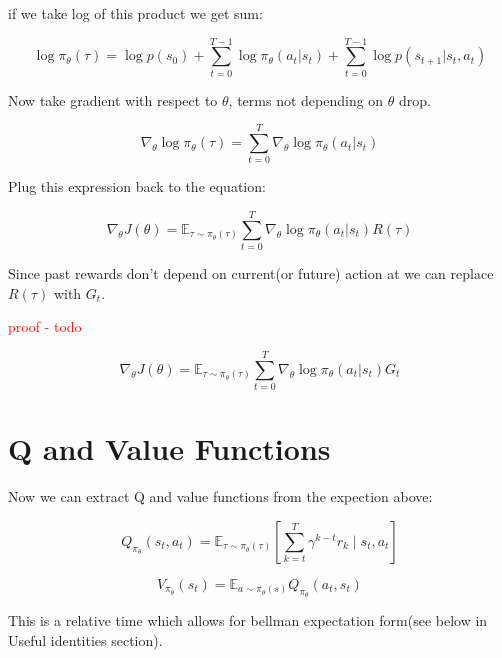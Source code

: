 \documentclass[preprint,12pt]{elsarticle}
\begin{document}
if we take log of this product we get sum:

\begin{equation}
\label{eq:trajectory-log-probability}
\log \pi_\theta(\tau) = \log p(s_0) +  \sum_{t=0}^{T-1} \log \pi_\theta(a_t|s_t) + \sum_{t=0}^{T-1} \log p(s_{t+1}|s_t, a_t)
\end{equation}

Now take gradient with respect to $\theta$, terms not depending on $\theta$ drop.

\begin{equation}
\label{eq:trajectory-score}
\nabla_\theta \log \pi_\theta(\tau) = \sum_{t=0}^T \nabla_\theta \log \pi_\theta(a_t | s_t)
\end{equation}

Plug this expression back to the equation:

\begin{equation}
\label{eq:policy-gradient-full-return}
\nabla_\theta J(\theta) = \mathbb{E}_{\tau \sim \pi_\theta(\tau)}  \sum_{t=0}^T \nabla_\theta \log \pi_\theta(a_t | s_t)  R(\tau)
\end{equation}


Since past rewards don’t depend on current(or future) action at  we can replace $R(\tau)$ with $G_t$.

\textcolor{red}{proof - todo} 
 
\begin{equation}
\label{eq:reinforce-gradient}
\nabla_\theta J(\theta) = \mathbb{E}_{\tau \sim \pi_\theta(\tau)}  \sum_{t=0}^T \nabla_\theta \log \pi_\theta(a_t | s_t)  G_t
\end{equation}

\section{Q and Value Functions}
Now we can extract Q and value functions from the expection above:

\begin{equation}
\label{eq:q-function}
Q_{\pi_\theta}(s_t, a_t) = \mathbb{E}_{\tau \sim \pi_\theta(\tau)}  \left[ \sum_{k=t}^T \gamma^{k-t} r_k \mid s_t, a_t \right]
\end{equation}

\begin{equation}
\label{eq:value-function}
V_{\pi_\theta}(s_t) = \mathbb{E}_{a \sim \pi_\theta(s)} Q_{\pi_\theta}(a_t, s_t)
\end{equation}

This is a relative time which allows for bellman expectation form(see below in Useful identities section).
\end{document}
